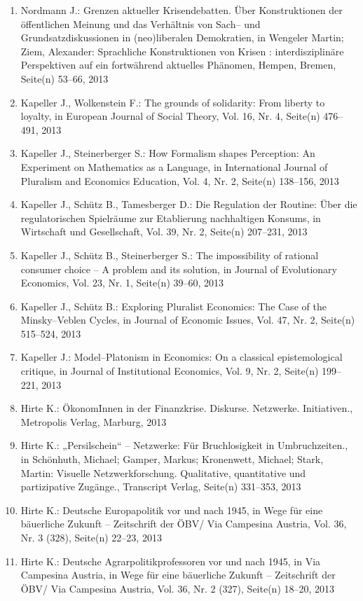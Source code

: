 \begin{enumerate}
	 \item Nordmann J.: Grenzen aktueller Krisendebatten. Über Konstruktionen der öffentlichen Meinung und das Verhältnis von Sach-- und Grundsatzdiskussionen in (neo)liberalen Demokratien, in Wengeler Martin; Ziem, Alexander: Sprachliche Konstruktionen von Krisen : interdisziplinäre Perspektiven auf ein fortwährend aktuelles Phänomen, Hempen, Bremen, Seite(n) 53--66, 2013
	 \item Kapeller J., Wolkenstein F.: The grounds of solidarity: From liberty to loyalty, in European Journal of Social Theory, Vol. 16, Nr. 4, Seite(n) 476--491, 2013
	 \item Kapeller J., Steinerberger S.: How Formalism shapes Perception: An Experiment on Mathematics as a Language, in International Journal of Pluralism and Economics Education, Vol. 4, Nr. 2, Seite(n) 138--156, 2013
	 \item Kapeller J., Schütz B., Tamesberger D.: Die Regulation der Routine: Über die regulatorischen Spielräume zur Etablierung nachhaltigen Konsums, in Wirtschaft und Gesellschaft, Vol. 39, Nr. 2, Seite(n) 207--231, 2013
	 \item Kapeller J., Schütz B., Steinerberger S.: The impossibility of rational consumer choice -- A problem and its solution, in Journal of Evolutionary Economics, Vol. 23, Nr. 1, Seite(n) 39--60, 2013
	 \item Kapeller J., Schütz B.: Exploring Pluralist Economics: The Case of the Minsky--Veblen Cycles, in Journal of Economic Issues, Vol. 47, Nr. 2, Seite(n) 515--524, 2013
	 \item Kapeller J.: Model--Platonism in Economics: On a classical epistemological critique, in Journal of Institutional Economics, Vol. 9, Nr. 2, Seite(n) 199--221, 2013
	 \item Hirte K.: ÖkonomInnen in der Finanzkrise. Diskurse. Netzwerke. Initiativen., Metropolis Verlag, Marburg, 2013
	 \item Hirte K.: „Persilschein“ – Netzwerke: Für Bruchlosigkeit in Umbruchzeiten., in Schönhuth, Michael; Gamper, Markus; Kronenwett, Michael; Stark, Martin: Visuelle Netzwerkforschung. Qualitative, quantitative und partizipative Zugänge., Transcript Verlag, Seite(n) 331--353, 2013
	 \item Hirte K.: Deutsche Europapolitik vor und nach 1945, in Wege für eine bäuerliche Zukunft – Zeitschrift der ÖBV/ Via Campesina Austria, Vol. 36, Nr. 3 (328), Seite(n) 22--23, 2013
	 \item Hirte K.: Deutsche Agrarpolitikprofessoren vor und nach 1945, in Via Campesina Austria, in Wege für eine bäuerliche Zukunft – Zeitschrift der ÖBV/ Via Campesina Austria, Vol. 36, Nr. 2 (327), Seite(n) 18--20, 2013

\end{enumerate}
